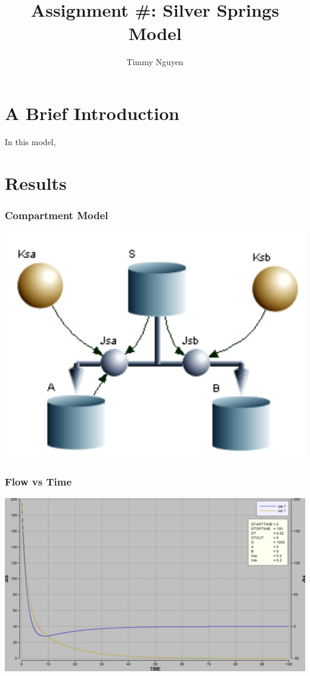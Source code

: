 \documentclass [12pt] {article}
\title{\vspace{-2cm}Assignment \#: Silver Springs Model}
\author{Timmy Nguyen}
\begin{document}
\maketitle
\section{A Brief Introduction}
In this model, 
\section{Results}

\subsubsection{Compartment Model}
\includegraphics[scale=1.6]{compartment_model.PNG} \\
\newpage


\subsubsection{Flow vs Time}
\includegraphics[scale=0.7]{flow_vs_time.PNG} \\
\end{document}
